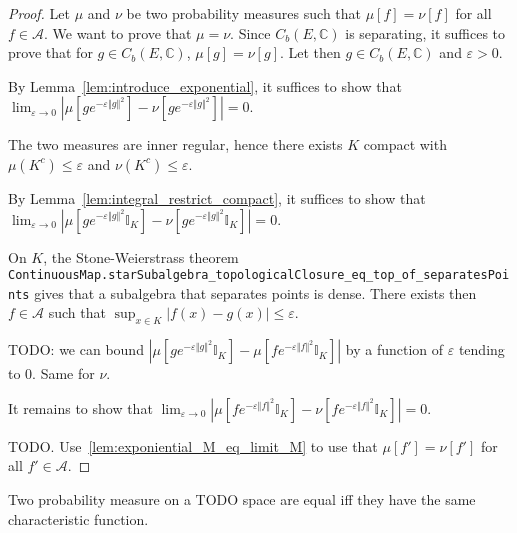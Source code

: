 \begin{proof}
Let $\mu$ and $\nu$ be two probability measures such that $\mu[f] = \nu[f]$ for all $f \in \mathcal A$. We want to prove that $\mu = \nu$. Since $C_b(E, \mathbb{C})$ is separating, it suffices to prove that for $g \in C_b(E, \mathbb{C})$, $\mu[g] = \nu[g]$. Let then $g \in C_b(E, \mathbb{C})$ and $\varepsilon > 0$.

By Lemma~\ref{lem:introduce_exponential}, it suffices to show that $\lim_{\varepsilon \to 0} \left\vert \mu\left[g e^{-\varepsilon \Vert g \Vert^2} \right] - \nu\left[g e^{-\varepsilon \Vert g \Vert^2} \right] \right\vert = 0$.

The two measures are inner regular, hence there exists $K$ compact with $\mu(K^c) \le \varepsilon$ and $\nu(K^c) \le \varepsilon$.

By Lemma~\ref{lem:integral_restrict_compact}, it suffices to show that $\lim_{\varepsilon \to 0} \left\vert \mu\left[g e^{-\varepsilon \Vert g \Vert^2} \mathbb{I}_K \right] - \nu\left[g e^{-\varepsilon \Vert g \Vert^2} \mathbb{I}_K \right] \right\vert = 0$.

On $K$, the Stone-Weierstrass theorem \texttt{ContinuousMap.starSubalgebra\_topologicalClosure\_eq\_top\_of\_separatesPoints} gives that a subalgebra that separates points is dense. There exists then $f \in \mathcal A$ such that $\sup_{x \in K} \left\vert f(x) - g(x) \right\vert \le \varepsilon$.

TODO: we can bound $\left\vert \mu\left[g e^{-\varepsilon \Vert g \Vert^2} \mathbb{I}_K \right] - \mu\left[f e^{-\varepsilon \Vert f \Vert^2} \mathbb{I}_K \right] \right\vert$ by a function of $\varepsilon$ tending to 0. Same for $\nu$.

It remains to show that $\lim_{\varepsilon \to 0} \left\vert \mu\left[f e^{-\varepsilon \Vert f \Vert^2} \mathbb{I}_K \right] - \nu\left[f e^{-\varepsilon \Vert f \Vert^2} \mathbb{I}_K \right] \right\vert = 0$.

TODO. Use~\ref{lem:exponiential_M_eq_limit_M} to use that $\mu[f'] = \nu[f']$ for all $f' \in \mathcal A$.
\end{proof}

\begin{lemma}\label{lem:ext_charFun}
Two probability measure on a TODO space are equal iff they have the same characteristic function.
\end{lemma}


